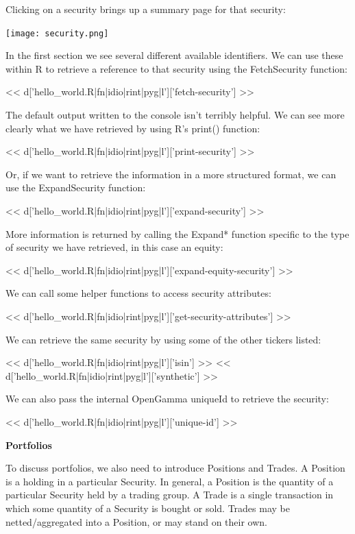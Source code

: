 \documentclass[custom, plainsections]{sciposter}
\begin{document}
\begin{multicols*}{2}
Clicking on a security brings up a summary page for that security:

\vspace{0.5cm}
\texttt{[image: security.png]}
\vspace{0.5cm}

In the first section we see several different available identifiers. We can use these within R to retrieve a reference to that security using the FetchSecurity function:

<< d['hello_world.R|fn|idio|rint|pyg|l']['fetch-security'] >>

The default output written to the console isn't terribly helpful. We can see more clearly what we have retrieved by using R's print() function:

<< d['hello_world.R|fn|idio|rint|pyg|l']['print-security'] >>

Or, if we want to retrieve the information in a more structured format, we can use the ExpandSecurity function:

<< d['hello_world.R|fn|idio|rint|pyg|l']['expand-security'] >>

\vfill
\pagebreak

More information is returned by calling the Expand* function specific to the type of security we have retrieved, in this case an equity:

<< d['hello_world.R|fn|idio|rint|pyg|l']['expand-equity-security'] >>

We can call some helper functions to access security attributes:

<< d['hello_world.R|fn|idio|rint|pyg|l']['get-security-attributes'] >>

We can retrieve the same security by using some of the other tickers listed:

<< d['hello_world.R|fn|idio|rint|pyg|l']['isin'] >>
<< d['hello_world.R|fn|idio|rint|pyg|l']['synthetic'] >>

We can also pass the internal OpenGamma uniqueId to retrieve the security:

<< d['hello_world.R|fn|idio|rint|pyg|l']['unique-id'] >>

\vspace{0.5cm}

\textbf{Portfolios}
\label{sec:portfolios}

To discuss portfolios, we also need to introduce Positions and Trades. A Position is a holding in a particular Security. In general, a Position is the quantity of a particular Security held by a trading group. A Trade is a single transaction in which some quantity of a Security is bought or sold. Trades may be netted/aggregated into a Position, or may stand on their own.


\end{multicols*}
\end{document}
